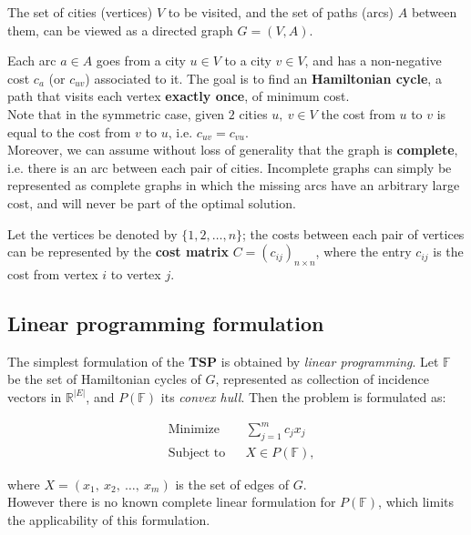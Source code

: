 \documentclass[
12pt,
a4paper,
oneside,
headinclude,
footinclude]{article}
\begin{document}
    The set of cities (vertices) $V$ to be visited, and the set of paths (arcs) $A$ between them, can be viewed as a directed graph $G = (V, A)$. 
    
    Each arc $a \in A$ goes from a city $u\in V$ to a city $v \in V$, and has a non-negative cost $c_a$ (or $c_{uv}$) associated to it. The goal is to find an \textbf{Hamiltonian cycle}, a path that visits each vertex \textbf{exactly once}, of minimum cost.\\
    Note that in the symmetric case, given $2$ cities $u,\ v \in V$ the cost from $u$ to $v$ is equal to the cost from $v$ to $u$, i.e. $c_{uv} = c_{vu}$.\\
    Moreover, we can assume without loss of generality that the graph is \textbf{complete}, i.e. there is an arc between each pair of cities. Incomplete graphs can simply be represented as complete graphs in which the missing arcs have an arbitrary large cost, and will never be part of the optimal solution.
    
    Let the vertices be denoted by $\{1,2,\ldots,n\}$; the costs between each pair of vertices can be represented by the \textbf{cost matrix} $C = (c_{ij})_{n \times n}$, where the entry $c_{ij}$ is the cost from vertex $i$ to vertex $j$.
    
    \subsection{Linear programming formulation}
    The simplest formulation of the \textbf{TSP} is obtained by \textit{linear programming}. Let $\mathbb{F}$ be the set of Hamiltonian cycles of $G$, represented as collection of incidence vectors in $\mathbb{R}^{\vert E \vert}$, and $P(\mathbb{F})$ its \textit{convex hull}. Then the problem is formulated as:
    
    \begin{equation*}
    \begin{aligned}
    & {\text{Minimize}}
    & & \sum_{j=1}^m{c_jx_j} \\
    & \text{Subject to}
    & & X \in P(\mathbb{F}), 
    \end{aligned}
    \end{equation*}
    
    where $X = (x_1,\ x_2,\ \ldots,\ x_m)$ is the set of edges of $G$.\\
    However there is no known complete linear formulation for $P(\mathbb{F})$, which limits the applicability of this formulation.
    
\end{document}
